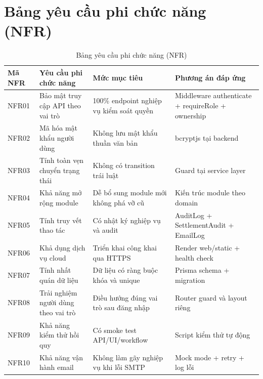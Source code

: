 \documentclass[12pt,a4paper]{report}
\begin{document}
\section{Bảng yêu cầu phi chức năng (NFR)}
\begin{table}[H]
\centering
\small
\begin{tabular}{|C{1.2cm}|L{4.9cm}|L{2.8cm}|L{4.2cm}|}
\hline
\textbf{Mã NFR} & \textbf{Yêu cầu phi chức năng} & \textbf{Mức mục tiêu} & \textbf{Phương án đáp ứng} \\ \hline
NFR01 & Bảo mật truy cập API theo vai trò & 100\% endpoint nghiệp vụ kiểm soát quyền & Middleware authenticate + requireRole + ownership \\ \hline
NFR02 & Mã hóa mật khẩu người dùng & Không lưu mật khẩu thuần văn bản & bcryptjs tại backend \\ \hline
NFR03 & Tính toàn vẹn chuyển trạng thái & Không có transition trái luật & Guard tại service layer \\ \hline
NFR04 & Khả năng mở rộng module & Dễ bổ sung module mới không phá vỡ cũ & Kiến trúc module theo domain \\ \hline
NFR05 & Tính truy vết thao tác & Có nhật ký nghiệp vụ và audit & AuditLog + SettlementAudit + EmailLog \\ \hline
NFR06 & Khả dụng dịch vụ cloud & Triển khai công khai qua HTTPS & Render web/static + health check \\ \hline
NFR07 & Tính nhất quán dữ liệu & Dữ liệu có ràng buộc khóa và unique & Prisma schema + migration \\ \hline
NFR08 & Trải nghiệm người dùng theo vai trò & Điều hướng đúng vai trò sau đăng nhập & Router guard và layout riêng \\ \hline
NFR09 & Khả năng kiểm thử hồi quy & Có smoke test API/UI/workflow & Script kiểm thử tự động \\ \hline
NFR10 & Khả năng vận hành email & Không làm gãy nghiệp vụ khi lỗi SMTP & Mock mode + retry + log lỗi \\ \hline
\end{tabular}
\caption{Bảng yêu cầu phi chức năng (NFR)}
\end{table}
\end{document}
